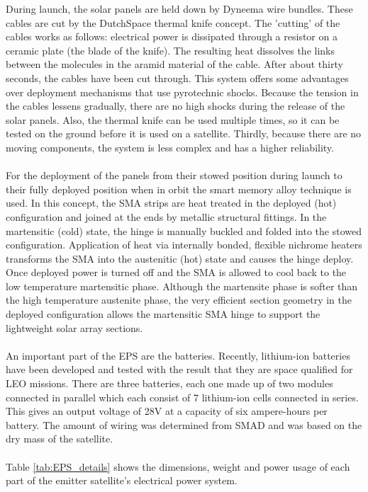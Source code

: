 During launch, the solar panels are held down by Dyneema wire bundles. These cables are cut by the DutchSpace thermal knife concept. The 'cutting' of the cables works as follows: electrical power is dissipated through a resistor on a ceramic plate (the blade of the knife). The resulting heat dissolves the links between the molecules in the aramid material of the cable. After about thirty seconds, the cables have been cut through. This system offers some advantages over deployment mechanisms that use pyrotechnic shocks. Because the tension in the cables lessens gradually, there are no high shocks during the release of the solar panels. Also, the thermal knife can be used multiple times, so it can be tested on the ground before it is used on a satellite. Thirdly, because there are no moving components, the system is less complex and has a higher reliability.
\\\\
For the deployment of the panels from their stowed position during launch to their fully deployed position when in orbit the smart memory alloy technique is used. In this concept, the SMA strips are heat treated in the deployed (hot) configuration and joined at the ends by metallic structural fittings. In the martensitic (cold) state, the hinge is manually buckled and folded into the stowed configuration. Application of heat via internally bonded, flexible nichrome heaters transforms the SMA into the austenitic (hot) state and causes the hinge deploy. Once deployed power is turned off and the SMA is allowed to cool back to the low temperature martensitic phase. Although the martensite phase is softer than the high temperature austenite phase, the very efficient section geometry in the deployed configuration allows the martensitic SMA hinge to support the lightweight solar array sections.
\\\\
An important part of the EPS are the batteries. Recently, lithium-ion batteries have been developed and tested with the result that they are space qualified for LEO missions. There are three batteries, each one made up of two modules connected in parallel which each consist of 7 lithium-ion cells connected in series. This gives an output voltage of 28V at a capacity of six ampere-hours per battery.
The amount of wiring was determined from SMAD and was based on the dry mass of the satellite.
\\ \\
Table \ref{tab:EPS_details} shows the dimensions, weight and power usage of each part of the emitter satellite's electrical power system.


